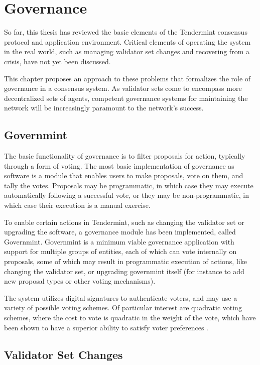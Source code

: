 \chapter{Governance}
\label{ch:governance}

So far, this thesis has reviewed the basic elements of the Tendermint consensus protocol and application environment.
Critical elements of operating the system in the real world, such as managing validator set changes
and recovering from a crisis, have not yet been discussed. 

This chapter proposes an approach to these problems that formalizes the role of governance in a consensus system.
As validator sets come to encompass more decentralized sets of agents, competent governance systems 
for maintaining the network will be increasingly paramount to the network's success.

\section{Governmint}

The basic functionality of governance is to filter proposals for action, typically through a form of voting.
The most basic implementation of governance as software is a module that enables users to make proposals,
vote on them, and tally the votes. 
Proposals may be programmatic, in which case they may execute automatically following a successful vote,
or they may be non-programmatic, in which case their execution is a manual exercise.

To enable certain actions in Tendermint, such as changing the validator set or upgrading the software,
a governance module has been implemented, called Governmint.
Governmint is a minimum viable governance application with support for multiple groups of entities,
each of which can vote internally on proposals, some of which may result in programmatic execution of actions,
like changing the validator set, or upgrading governmint itself (for instance to add new proposal types or other voting mechanisms).

The system utilizes digital signatures to authenticate voters, 
and may use a variety of possible voting schemes.
Of particular interest are quadratic voting schemes,
where the cost to vote is quadratic in the weight of the vote,
which have been shown to have a superior ability to satisfy voter preferences \cite{posner2013quadratic}.

\section{Validator Set Changes}

